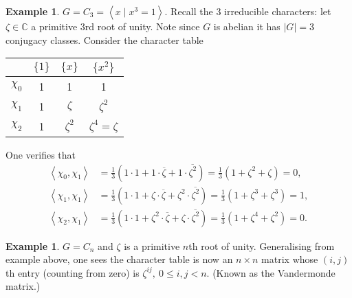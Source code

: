 \documentclass{article}
\newcommand{\la}{\left\langle}
\newcommand{\ra}{\right\rangle}
\newcommand{\C}{\mathbb{C}}
\theoremstyle{definition}
\newtheorem{example}[defn]{Example}
\begin{document}
\begin{example}
$G=C_3=\la x\mid x^3=1\ra$. Recall the 3 irreducible characters: let $\zeta\in\C$ a primitive 3rd root of unity. Note since $G$ is abelian it has $|G|=3$ conjugacy classes. Consider the character table

\begin{table}[H]
\centering
\begin{tabular}{c|ccc}
         & $\{1\}$ & $\{x\}$   & $\{x^2\}$       \\ \hline
$\chi_0$ & 1       & 1         & 1               \\
$\chi_1$ & 1       & $\zeta$   & $\zeta^2$       \\
$\chi_2$ & 1       & $\zeta^2$ & $\zeta^4=\zeta$
\end{tabular}
\end{table}
One verifies that
\[
\begin{aligned}
\la\chi_0,\chi_1\ra&=\frac13\left(1\cdot 1+1\cdot\overline\zeta+1\cdot \overline{\zeta^2}\right)=\frac13\left(1+\zeta^2+\zeta\right)=0,\\
\la\chi_1,\chi_1\ra&=\frac13\left(1\cdot 1+\zeta\cdot\overline\zeta+\zeta^2\cdot\overline{\zeta^2}\right)=\frac13\left(1+\zeta^3+\zeta^3\right)=1,\\
\la\chi_2,\chi_1\ra&=\frac13\left(1\cdot 1+\zeta^2\cdot\overline\zeta+\zeta\cdot \overline{\zeta^2}\right)=\frac13\left(1+\zeta^4+\zeta^2\right)=0.
\end{aligned}
\]
\end{example}

\begin{example}
$G=C_n$ and $\zeta$ is a primitive $n$th root of unity. Generalising from example above, one sees the character table is now an $n\times n$ matrix whose $(i,j)$th entry (counting from zero) is $\zeta^{ij},\ 0\leq i,j<n$. (Known as the Vandermonde matrix.)
\end{example}
\end{document}

